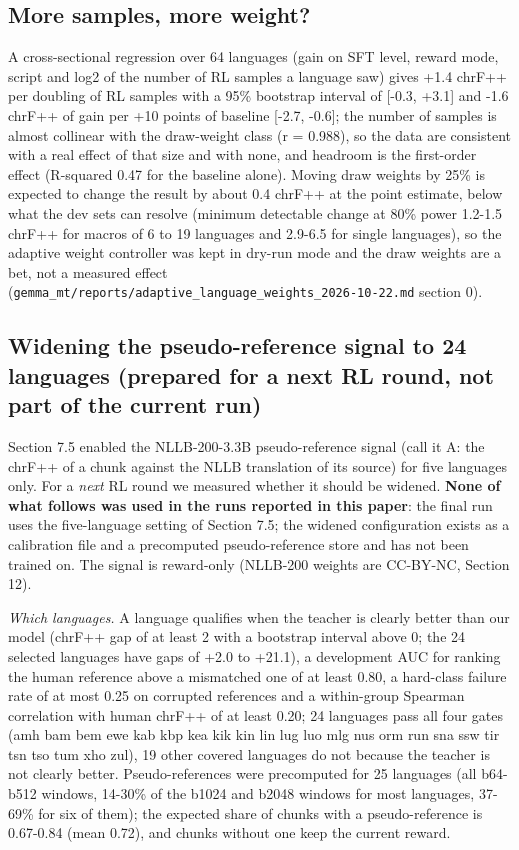 \subsection{More samples, more weight?}\label{more-samples-more-weight}

A cross-sectional regression over 64 languages (gain on SFT level, reward mode, script and log2 of the number of RL samples a language saw) gives +1.4 chrF++ per doubling of RL samples with a 95\% bootstrap interval of {[}-0.3, +3.1{]} and -1.6 chrF++ of gain per +10 points of baseline {[}-2.7, -0.6{]}; the number of samples is almost collinear with the draw-weight class (r = 0.988), so the data are consistent with a real effect of that size and with none, and headroom is the first-order effect (R-squared 0.47 for the baseline alone). Moving draw weights by 25\% is expected to change the result by about 0.4 chrF++ at the point estimate, below what the dev sets can resolve (minimum detectable change at 80\% power 1.2-1.5 chrF++ for macros of 6 to 19 languages and 2.9-6.5 for single languages), so the adaptive weight controller was kept in dry-run mode and the draw weights are a bet, not a measured effect (\texttt{gemma\_mt/reports/adaptive\_language\_weights\_2026-10-22.md} section 0).

\subsection{Widening the pseudo-reference signal to 24 languages (prepared for a next RL round, not part of the current run)}\label{widening-the-pseudo-reference-signal-to-24-languages-prepared-for-a-next-rl-round-not-part-of-the-current-run}

Section 7.5 enabled the NLLB-200-3.3B pseudo-reference signal (call it A: the chrF++ of a chunk against the NLLB translation of its source) for five languages only. For a \emph{next} RL round we measured whether it should be widened. \textbf{None of what follows was used in the runs reported in this paper}: the final run uses the five-language setting of Section 7.5; the widened configuration exists as a calibration file and a precomputed pseudo-reference store and has not been trained on. The signal is reward-only (NLLB-200 weights are CC-BY-NC, Section 12).

\emph{Which languages.} A language qualifies when the teacher is clearly better than our model (chrF++ gap of at least 2 with a bootstrap interval above 0; the 24 selected languages have gaps of +2.0 to +21.1), a development AUC for ranking the human reference above a mismatched one of at least 0.80, a hard-class failure rate of at most 0.25 on corrupted references and a within-group Spearman correlation with human chrF++ of at least 0.20; 24 languages pass all four gates (amh bam bem ewe kab kbp kea kik kin lin lug luo mlg nus orm run sna ssw tir tsn tso tum xho zul), 19 other covered languages do not because the teacher is not clearly better. Pseudo-references were precomputed for 25 languages (all b64-b512 windows, 14-30\% of the b1024 and b2048 windows for most languages, 37-69\% for six of them); the expected share of chunks with a pseudo-reference is 0.67-0.84 (mean 0.72), and chunks without one keep the current reward.


